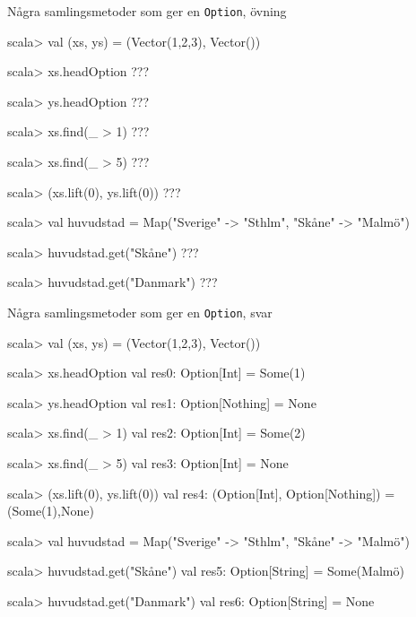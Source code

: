 \begin{Slide}{Några samlingsmetoder som ger en \texttt{Option}, övning}
\begin{REPLsmall}
scala> val (xs, ys) = (Vector(1,2,3), Vector())

scala> xs.headOption
???

scala> ys.headOption
???

scala> xs.find(_ > 1)
???

scala> xs.find(_ > 5)
???

scala> (xs.lift(0), ys.lift(0))
???

scala> val huvudstad = Map("Sverige" -> "Sthlm", "Skåne" -> "Malmö")

scala> huvudstad.get("Skåne")
???

scala> huvudstad.get("Danmark")
???
\end{REPLsmall}
\end{Slide}

\begin{Slide}{Några samlingsmetoder som ger en \texttt{Option}, svar}
\begin{REPLsmall}
scala> val (xs, ys) = (Vector(1,2,3), Vector())

scala> xs.headOption
val res0: Option[Int] = Some(1)

scala> ys.headOption
val res1: Option[Nothing] = None

scala> xs.find(_ > 1)
val res2: Option[Int] = Some(2)

scala> xs.find(_ > 5)
val res3: Option[Int] = None

scala> (xs.lift(0), ys.lift(0))
val res4: (Option[Int], Option[Nothing]) = (Some(1),None)

scala> val huvudstad = Map("Sverige" -> "Sthlm", "Skåne" -> "Malmö")

scala> huvudstad.get("Skåne")
val res5: Option[String] = Some(Malmö)

scala> huvudstad.get("Danmark")
val res6: Option[String] = None
\end{REPLsmall}
\end{Slide}
